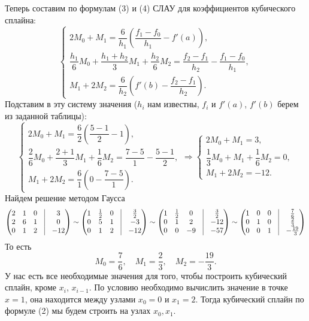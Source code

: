 \documentclass[a4paper, 12pt]{article}
\begin{document}
\begin{enumerate}
	Теперь составим по формулам (3) и (4) СЛАУ для коэффициентов кубического сплайна:
	$$\begin{cases}
		2M_0 + M_1 =  \dfrac{6}{h_1}\left(\dfrac{f_1-f_0}{h_1} - f'(a)\right),\\
		\dfrac{h_1}{6}M_{0} + \dfrac{h_1 + h_{2}}{3}M_1 + \dfrac{h_{2}}{6}M_{2} = \dfrac{f_{2} - f_1}{h_{2}} - \dfrac{f_1 - f_{0}}{h_1},\\
		M_{1} + 2M_2 = \dfrac{6}{h_2}\left(f'(b) - \dfrac{f_2-f_{1}}{h_2} \right).
	\end{cases}$$
	Подставим в эту систему значения ($h_i$ нам известны, $f_i$ и $f'(a)$, $f'(b)$ берем из заданной таблицы):
	$$\begin{cases}
		2M_0 + M_1 =  \dfrac{6}{2}\left(\dfrac{5-1}{2} - 1\right),\\
		\dfrac{2}{6}M_{0} + \dfrac{2 +1}{3}M_1 + \dfrac{1}{6}M_{2} = \dfrac{7 -5}{1} - \dfrac{5 - 1}{2},\\
		M_{1} + 2M_2 = \dfrac{6}{1}\left(0 - \dfrac{7-5}{1} \right).
	\end{cases}
	\Rightarrow 
	\begin{cases}
		2M_0 + M_1 =  3,\\
		\dfrac{1}{3}M_{0} + M_1 + \dfrac{1}{6}M_{2} = 0,\\
		M_{1} + 2M_2 = -12.
	\end{cases}$$
	Найдем решение методом Гаусса 
	$$\begin{pmatrix}
		2&1&0&\vline&3\\
		2&6&1&\vline&0\\
		0&1&2&\vline&-12
	\end{pmatrix}
	\sim 
	\begin{pmatrix}
		1&\frac12&0&\vline&\frac32\\
		0&5&1&\vline&-3\\
		0&1&2&\vline&-12
	\end{pmatrix}
	\sim
	\begin{pmatrix}
		1&\frac12&0&\vline&\frac32\\
		0&1&2&\vline&-12\\
		0&0&-9&\vline&-57
	\end{pmatrix}
	\sim
	\begin{pmatrix}
		1&0&0&\vline&\frac76\\
		0&1&0&\vline&\frac{2}{3}\\
		0&0&1&\vline&-\frac{19}{3}
	\end{pmatrix}$$
	То есть $$M_0 = \dfrac76,\quad M_1 = \dfrac23,\quad M_2 = -\dfrac{19}{3}.$$
	У нас есть все необходимые значения для того, чтобы построить кубический сплайн, кроме $x_i$, $x_{i-1}$. По условию необходимо вычислить значение в точке $x=1$, она находится между узлами $x_0 = 0$ и $x_1 = 2$. Тогда кубический сплайн по формуле (2) мы будем строить на узлах $x_0, x_1$.\\\\

\end{enumerate}
\end{document}

